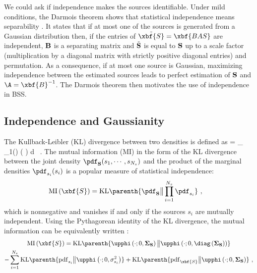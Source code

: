 We could ask if independence makes the sources identifiable. Under mild conditions, the Darmois theorem \citep{darmois53} shows that statistical independence means separability \citep{ica:comon94}. 
It states that if at most one of the sources is generated from a Gaussian distribution then, if the entries of $\tilde{\xbf{S}} = \xbf{BAS}$ are independent, $\bf B$ is a separating matrix and $\tilde{\bf S}$ is equal to $\bf S$ up to a scale factor (multiplication by a diagonal matrix with strictly positive diagonal entries) and permutation. As a consequence, if at most one source is Gaussian, maximizing independence between the estimated sources leads to perfect estimation of $\bf S$ and $\A = \xbf{B}^{-1}$. The Darmois theorem then motivates the use of independence in BSS.
 
\subsection{Independence and Gaussianity}
The Kullback-Leibler (KL) divergence between two densities is defined as
\be
{} = \int_ \pdf_{1}() \log \left(  \right) d~ .
\ee
The mutual information (MI) in the form of the KL divergence between the joint density $\pdf_{\bf S}(s_1,\cdots,s_{N_s})$ and the product of the marginal densities $\pdf_{s_i}(s_i)$ is a popular measure of statistical independence:
\begin{eqnarray}
\label{eq:KL_indep}
\mathrm{MI} \left(\xbf{S}\right) & = \mathrm{KL}\parenth{\pdf_{\bf S}\big{\|}\prod_{i=1}^{N_s}  \pdf_{s_i}} ~,
\end{eqnarray}
which is nonnegative and vanishes if and only if the sources $s_i$ are mutually independent. Using the Pythagorean identity of the KL divergence, the mutual information can be equivalently written \citep{ica:geomindep,ica:comon94}:
\begin{multline}
\label{eq:KL_decomp}
\mathrm{MI} \left( \xbf{S} \right)  =  \mathrm{KL}\parenth{\upphi\left(\cdot;0,{{\boldsymbol \Sigma_{\bf S}}}\right)\big{\|} \upphi\left(\cdot;0,\diag\left({{\boldsymbol \Sigma_{\bf S}}}\right)\right)} \\ - \sum_{i=1}^{N_s} \mathrm{KL}\parenth{\mathrm{pdf}_{s_i}\big{\|} \upphi\left(\cdot;0,\sigma_{s_i}^2 \right)} + \mathrm{KL}\parenth{\mathrm{pdf}_{\xbf{S}}\big{\|}\upphi\left(\cdot;0,{{\boldsymbol \Sigma_{\bf S}}}\right)} ~ ,
\end{multline}
